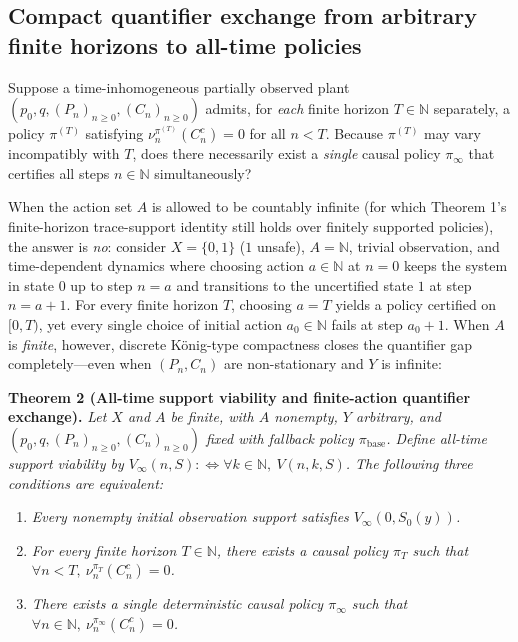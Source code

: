 \documentclass[11pt,a4paper]{article}
\newcounter{none}
\providecommand{\tightlist}{\setlength{\itemsep}{2pt}\setlength{\parskip}{0pt}}
\begin{document}
\subsection{Compact quantifier exchange from arbitrary finite horizons
to all-time
policies}\label{compact-quantifier-exchange-from-arbitrary-finite-horizons-to-all-time-policies}

Suppose a time-inhomogeneous partially observed plant
\((p_0, q, (P_n)_{n\ge 0}, (C_n)_{n\ge 0})\) admits, for \emph{each}
finite horizon \(T \in \mathbb{N}\) separately, a policy \(\pi^{(T)}\)
satisfying \(\nu_n^{\pi^{(T)}}(C_n^c) = 0\) for all \(n < T\). Because
\(\pi^{(T)}\) may vary incompatibly with \(T\), does there necessarily
exist a \emph{single} causal policy \(\pi_\infty\) that certifies all
steps \(n \in \mathbb{N}\) simultaneously?

When the action set \(A\) is allowed to be countably infinite (for which
Theorem 1's finite-horizon trace-support identity still holds over
finitely supported policies), the answer is \emph{no}: consider
\(X = \{0, 1\}\) (\(1\) unsafe), \(A = \mathbb{N}\), trivial
observation, and time-dependent dynamics where choosing action
\(a \in \mathbb{N}\) at \(n = 0\) keeps the system in state \(0\) up to
step \(n = a\) and transitions to the uncertified state \(1\) at step
\(n = a + 1\). For every finite horizon \(T\), choosing \(a = T\) yields
a policy certified on \([0, T)\), yet every single choice of initial
action \(a_0 \in \mathbb{N}\) fails at step \(a_0 + 1\). When \(A\) is
\emph{finite}, however, discrete König-type compactness
\citep{konig1927} closes the quantifier gap completely---even when
\((P_n, C_n)\) are non-stationary and \(Y\) is infinite:

\textbf{Theorem 2 (All-time support viability and finite-action
quantifier exchange).} \emph{Let \(X\) and \(A\) be finite, with \(A\)
nonempty, \(Y\) arbitrary, and
\((p_0, q, (P_n)_{n\ge 0}, (C_n)_{n\ge 0})\) fixed with fallback policy
\(\pi_{\mathrm{base}}\). Define all-time support viability by
\(V_\infty(n, S) :\iff \forall k \in \mathbb{N},\ V(n, k, S)\). The
following three conditions are equivalent:}

\begin{enumerate}
\def\labelenumi{\arabic{enumi}.}
\tightlist
\item
  \emph{Every nonempty initial observation support satisfies
  \(V_\infty(0, S_0(y))\).}
\item
  \emph{For every finite horizon \(T \in \mathbb{N}\), there exists a
  causal policy \(\pi_T\) such that
  \(\forall n < T,\ \nu_n^{\pi_T}(C_n^c) = 0\).}
\item
  \emph{There exists a single deterministic causal policy \(\pi_\infty\)
  such that
  \(\forall n \in \mathbb{N},\ \nu_n^{\pi_\infty}(C_n^c) = 0\).}
\end{enumerate}
\end{document}
